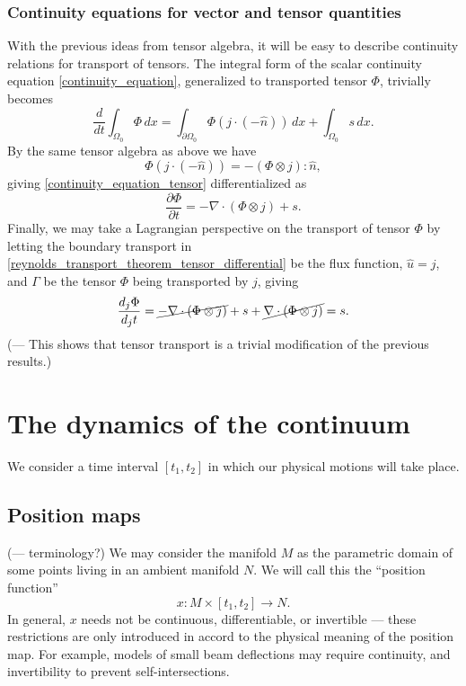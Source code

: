 \documentclass[11pt,a4paper]{memoir}
\newcommand{\Part}[2]{\frac{\partial #1}{\partial #2}}
\begin{document}
\subsubsection{Continuity equations for vector and tensor quantities}
With the previous ideas from tensor algebra, it will be easy to describe continuity relations for transport of tensors. The integral form of the scalar continuity equation \eqref{continuity_equation}, generalized to transported tensor $\Phi$, trivially becomes
\begin{equation}\label{continuity_equation_tensor}
    \frac{d}{dt} \int_{\Omega_0} \Phi\,dx = \int_{\partial\Omega_0} \Phi \left(j\cdot (-\hat{n})\right)\,dx + \int_{\Omega_0} s\,dx.
\end{equation}
By the same tensor algebra as above we have
    $$
        \Phi \left(j\cdot (-\hat{n})\right) = -\left(\Phi \otimes j\right) : \hat{n},
    $$
giving \eqref{continuity_equation_tensor} differentialized as
\begin{equation}\label{continuity_equation_tensor_differential}
    \Part{\Phi}{t} = -\nabla\cdot (\Phi \otimes j) + s.
\end{equation}
Finally, we may take a Lagrangian perspective on the transport of tensor $\Phi$ by letting the boundary transport in
\eqref{reynolds_transport_theorem_tensor_differential}
be the flux function, $\hat{u} = j$,
and $\Gamma$ be the tensor $\Phi$ being transported by $j$, giving
\begin{equation}\label{lagrangian_transport_tensor_differential}
    \frac{d_j \Phi}{d_j t} = \cancel{-\nabla\cdot\left(\Phi\otimes j\right)} + s + \cancel{\nabla\cdot\left(\Phi\otimes j\right)} = s.
\end{equation}
(--- This shows that tensor transport is a trivial modification of the previous results.)

\section{The dynamics of the continuum}
We consider a time interval $[t_1, t_2]$ in which our physical motions will take place.

\subsection{Position maps}
(--- terminology?)
We may consider the manifold $M$ as the parametric domain of some points living in an ambient manifold $N$.
We will call this the ``position function''
    $$x:M\times [t_1, t_2] \rightarrow N.$$
In general, $x$ needs not be continuous, differentiable, or invertible
--- these restrictions are only introduced in accord to the physical meaning of the position map. For example, models of small beam deflections
may require continuity, and invertibility to prevent self-intersections.
\end{document}
